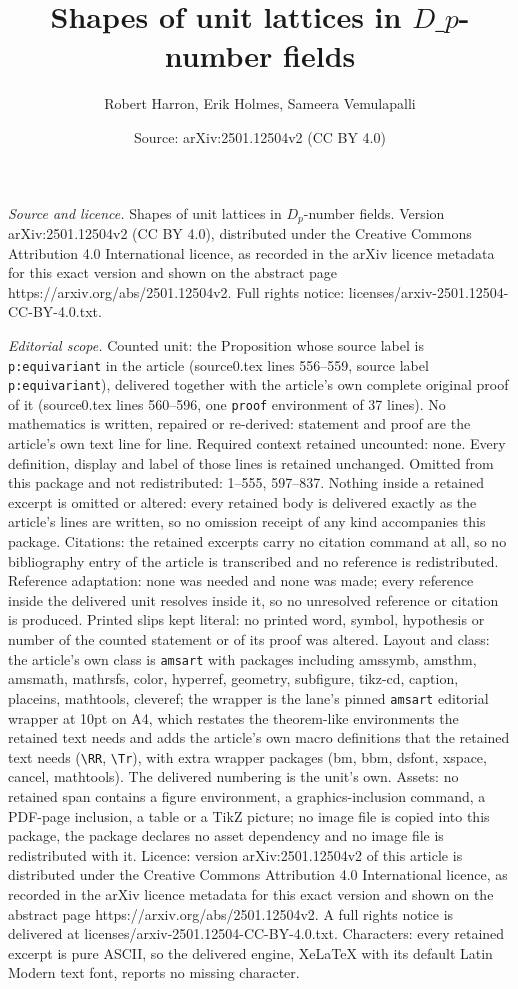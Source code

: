 \documentclass[10pt,a4paper]{amsart}
\title[Shapes of unit lattices in $D\_p$-number fields]{Shapes of unit lattices in $D\_p$-number fields}
\author{Robert Harron, Erik Holmes, Sameera Vemulapalli}
\date{Source: arXiv:2501.12504v2 (CC BY 4.0)}
\begin{document}
\maketitle

\noindent\emph{Source and licence.} Shapes of unit lattices in $D_p$-number fields. Version arXiv:2501.12504v2 (CC BY 4.0), distributed under the Creative Commons Attribution 4.0 International licence, as recorded in the arXiv licence metadata for this exact version and shown on the abstract page https://arxiv.org/abs/2501.12504v2. Full rights notice: licenses/arxiv-2501.12504-CC-BY-4.0.txt.\par\smallskip

\noindent\textit{Editorial scope.} Counted unit: the Proposition whose source label is \texttt{p:equivariant} in the article (source0.tex lines 556--559, source label \texttt{p:equivariant}), delivered together with the article's own complete original proof of it (source0.tex lines 560--596, one \texttt{proof} environment of 37 lines). No mathematics is written, repaired or re-derived: statement and proof are the article's own text line for line. Required context retained uncounted: none. Every definition, display and label of those lines is retained unchanged. Omitted from this package and not redistributed: 1--555, 597--837. Nothing inside a retained excerpt is omitted or altered: every retained body is delivered exactly as the article's lines are written, so no omission receipt of any kind accompanies this package. Citations: the retained excerpts carry no citation command at all, so no bibliography entry of the article is transcribed and no reference is redistributed. Reference adaptation: none was needed and none was made; every reference inside the delivered unit resolves inside it, so no unresolved reference or citation is produced. Printed slips kept literal: no printed word, symbol, hypothesis or number of the counted statement or of its proof was altered. Layout and class: the article's own class is \texttt{amsart} with packages including amssymb, amsthm, amsmath, mathrsfs, color, hyperref, geometry, subfigure, tikz-cd, caption, placeins, mathtools, cleveref; the wrapper is the lane's pinned \texttt{amsart} editorial wrapper at 10pt on A4, which restates the theorem-like environments the retained text needs and adds the article's own macro definitions that the retained text needs (\texttt{\textbackslash RR}, \texttt{\textbackslash Tr}), with extra wrapper packages (bm, bbm, dsfont, xspace, cancel, mathtools). The delivered numbering is the unit's own. Assets: no retained span contains a figure environment, a graphics-inclusion command, a PDF-page inclusion, a table or a TikZ picture; no image file is copied into this package, the package declares no asset dependency and no image file is redistributed with it. Licence: version arXiv:2501.12504v2 of this article is distributed under the Creative Commons Attribution 4.0 International licence, as recorded in the arXiv licence metadata for this exact version and shown on the abstract page https://arxiv.org/abs/2501.12504v2. A full rights notice is delivered at licenses/arxiv-2501.12504-CC-BY-4.0.txt. Characters: every retained excerpt is pure ASCII, so the delivered engine, XeLaTeX with its default Latin Modern text font, reports no missing character.
\end{document}
